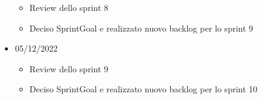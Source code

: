 \begin{itemize}
        \begin{itemize}
            \item Review dello sprint 8
            \item Deciso SprintGoal e realizzato nuovo backlog per lo sprint 9
        \end{itemize}
    \item 05/12/2022
        \begin{itemize}
            \item Review dello sprint 9
            \item Deciso SprintGoal e realizzato nuovo backlog per lo sprint 10
        \end{itemize}
\end{itemize}


